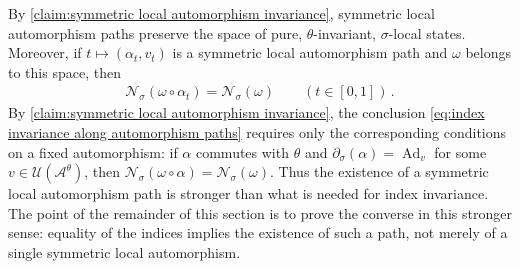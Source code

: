 \documentclass[a4paper,10pt]{article}
\numberwithin{equation}{section}
\theoremstyle{plain}
\theoremstyle{plain}
\newtheorem{lem}[lem]{\protect\lemmaname}
\theoremstyle{plain}
\theoremstyle{plain}
\theoremstyle{plain}
\theoremstyle{remark}
\theoremstyle{definition}
\providecommand{\lemmaname}{Lemma}
\newcommand{\calA}{\mathcal{A}}
\newcommand{\calB}{\mathcal{B}}
\newcommand{\calN}{\mathcal{N}}
\newcommand{\calU}{\mathcal{U}}
\newcommand{\Ad}[1]{\operatorname{Ad}_{#1}}
\newcommand{\eq}[1]{\begin{align*}#1\end{align*}}
\newcommand{\eql}[1]{\begin{align}#1\end{align}}
\begin{document}
By \cref{claim:symmetric local automorphism invariance}, symmetric local
automorphism paths preserve the space of pure, \(\theta\)-invariant,
\(\sigma\)-local states. Moreover, if
\(t\mapsto(\alpha_t,v_t)\) is a symmetric local automorphism path and
\(\omega\) belongs to this space, then
\eql{\label{eq:index invariance along automorphism paths}
    \calN_\sigma(\omega\circ\alpha_t)
    =
    \calN_\sigma(\omega)
    \qquad
    (t\in[0,1])\,.
}
By \cref{claim:symmetric local automorphism invariance}, the conclusion
\cref{eq:index invariance along automorphism paths} requires only the
corresponding conditions on a fixed automorphism: if \(\alpha\) commutes
with \(\theta\) and
\(\partial_\sigma(\alpha)=\Ad{v}\) for some
\(v\in\calU(\calA^\theta)\), then
\(\calN_\sigma(\omega\circ\alpha)=\calN_\sigma(\omega)\). Thus the
existence of a symmetric local automorphism path is stronger than what
is needed for index invariance. The point of the remainder of this
section is to prove the converse in this stronger sense: equality of the
indices implies the existence of such a path, not merely of a single
symmetric local automorphism.



\end{document}
